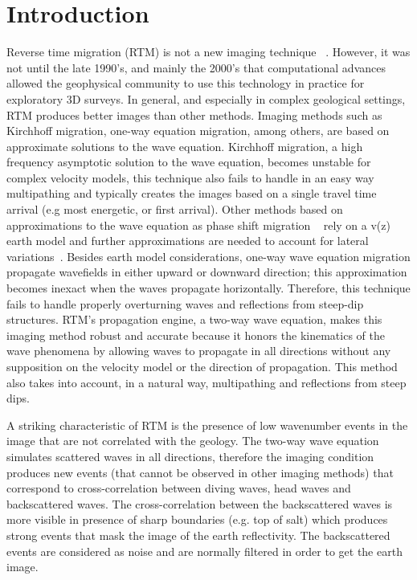 \section{Introduction}

Reverse time migration (RTM) is not a new imaging technique ~\citep{baysal:1514, whitmore:382, GPR:GPR413}.
However, it was not until the late 1990’s, and mainly the 2000’s that computational
 advances allowed the geophysical community to use this technology in practice for exploratory
3D surveys. In general, and especially in complex geological settings, RTM produces better 
images than other methods. Imaging methods such as Kirchhoff migration, one-way equation
 migration, among others, are based on approximate solutions to the wave equation. Kirchhoff migration,
 a high frequency asymptotic solution to the wave equation, becomes unstable for complex velocity models,
this technique also fails to handle in an easy way multipathing and typically creates the images based on a 
single travel time arrival (e.g most energetic, or first arrival). Other methods based on approximations to the wave
 equation as phase shift migration ~\citep{gazdag:1342} rely on a v(z) earth model and further
 approximations are needed to account for lateral variations~\citep{gazdag:124}.
 Besides earth model considerations, one-way wave equation migration propagate wavefields in 
either upward or downward direction; this approximation becomes inexact when the waves 
propagate horizontally. Therefore, this technique fails to handle properly overturning
waves and reflections from steep-dip structures. RTM's propagation engine, a two-way wave equation, 
makes this imaging method robust and accurate because it honors the kinematics of 
the wave phenomena by allowing waves to propagate in all directions without any supposition
on the velocity model or the direction of propagation. This method also takes into account,
 in a natural way, multipathing and  reflections from steep dips.

A striking characteristic of RTM is the presence of low wavenumber events in the image that
 are not correlated with the geology. The two-way wave equation simulates scattered waves in all 
directions, therefore the imaging condition produces new events (that cannot be observed in 
other imaging methods) that correspond to cross-correlation between diving waves, head waves 
and backscattered waves. The cross-correlation between the backscattered waves is more visible in
presence of sharp boundaries (e.g. top of salt) which produces strong events that mask the image of the 
earth reflectivity. The backscattered events are considered as noise and are normally filtered in order
to get the earth image.

